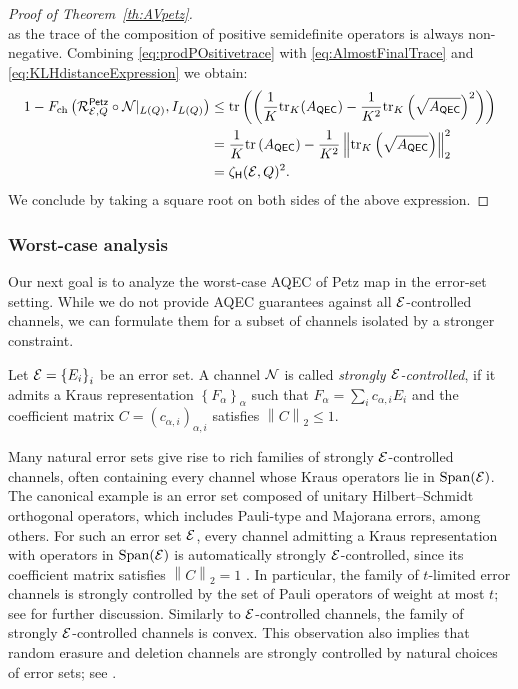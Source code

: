 \documentclass[10pt]{article}
\DeclareMathOperator{\Span}{Span}
\newcommand{\tr}{\mathrm{tr}}
\newcommand{\p}[1]{\left(#1\right)}
\newcommand{\ppp}[1]{\left\{#1\right\}}
\newcommand{\norm}[1]{\left\|#1\right\|}
\newcommand{\s}[1]{\mathsf{#1}}
\begin{document}
\begin{proof}[Proof of Theorem~\ref{th:AVpetz}]
\begin{equation}
          \end{equation}
     as the trace of the composition of positive semidefinite operators is always non-negative. Combining \eqref{eq:prodPOsitivetrace} with \eqref{eq:AlmostFinalTrace} and \eqref{eq:KLHdistanceExpression} we obtain:
     \begin{align*}
          1-F_{\mathrm{ch}}\p{\calR_{\calE,Q}^{\s{\s{Petz}}}\circ \calN|_{L(Q)},I_{L(Q)}}&\leq \tr\p{\p{\frac{1}{K}\tr_K(A_{\s{QEC}})-\frac{1}{K^2}\tr_K\p{\sqrt{A_{\s{QEC}}}}^2}}\\
         &=\frac{1}{K}\tr\p{A_{\s{QEC}}}-\frac{1}{K^2}\norm{\tr_K\p{\sqrt{A_{\s{QEC}}}}}_2^2\\
         &=\zeta_{\s{H}}(\calE,Q)^2.
     \end{align*}
     We conclude by taking a square root on both sides of the above expression. 
 \end{proof}

 \subsubsection*{Worst-case analysis}
Our next goal is to analyze the worst-case AQEC of Petz map in the error-set setting. While we do not provide AQEC guarantees against all ${\cal E}$-controlled channels, we can formulate them for a subset of channels isolated by a stronger 
constraint.
\begin{definition}
Let $\calE=\ppp{E_i}_i$ be an error set. A channel ${\cal N}$ is called \emph{strongly ${\cal E}$-controlled}, if it admits a Kraus representation $\ppp{F_\alpha}_{\alpha}$ such that $F_{\alpha}=\sum_{i}c_{\alpha,i}E_i$ and the coefficient matrix $C=(c_{\alpha,i})_{\alpha,i}$ satisfies $\norm{C}_{2}\leq 1$.
\end{definition}

Many natural error sets give rise to rich families of strongly ${\cal E}$-controlled channels, often containing every channel whose Kraus operators lie in $\Span(\calE)$. The canonical example is an error set composed of unitary Hilbert--Schmidt orthogonal operators, which includes Pauli-type and Majorana errors, among others. For such an error set ${\cal E}$, every channel admitting a Kraus representation with operators in $\Span(\calE)$ is automatically strongly ${\cal E}$-controlled, since its coefficient matrix satisfies $\norm{C}_{2}=1$ \cite[Proposition~2.3]{ma2025haar}. In particular, the family of $t$-limited error channels is strongly controlled by the set of Pauli operators of weight at most $t$; see \cite[Example~1]{Elimelech2026Theory} for further discussion. Similarly to ${\cal E}$-controlled channels, the family of strongly ${\cal E}$-controlled channels is convex. This observation also implies that random erasure and deletion channels are strongly controlled by natural choices of error sets; see \cite[Sections~2.1.2, 2.1.3]{Elimelech2026Theory}.
\end{document}
